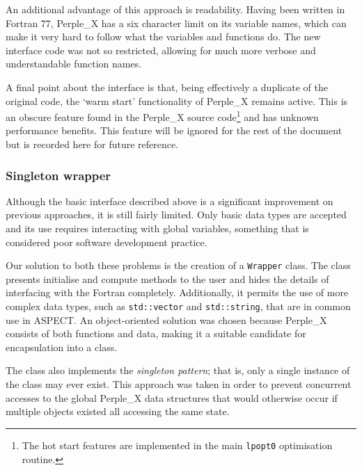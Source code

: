 An additional advantage of this approach is readability.
Having been written in Fortran 77, Perple\_X has a six character limit on its variable names, which can make it very hard to follow what the variables and functions do.
The new interface code was not so restricted, allowing for much more verbose and understandable function names.

A final point about the interface is that, being effectively a duplicate of the original code, the `warm start' functionality of Perple\_X remains active.
This is an obscure feature found in the Perple\_X source code\footnote{The hot start features are implemented in the main \texttt{lpopt0} optimisation routine.} and has unknown performance benefits.
This feature will be ignored for the rest of the document but is recorded here for future reference.

\subsubsection{Singleton wrapper}

Although the basic interface described above is a significant improvement on previous approaches, it is still fairly limited.
Only basic data types are accepted and its use requires interacting with global variables, something that is considered poor software development practice.

Our solution to both these problems is the creation of a \texttt{Wrapper} class.
The class presents \mbox{initialise} and compute methods to the user and hides the details of interfacing with the Fortran \mbox{completely}.
\mbox{Additionally}, it permits the use of more complex data types, such as \texttt{std::vector} and \texttt{std::string}, that are in common use in ASPECT.
An object-oriented solution was chosen because Perple\_X consists of both functions and data, making it a suitable candidate for encapsulation into a class.

The class also implements the \textit{singleton pattern}; that is, only a single instance of the class may ever exist.
This approach was taken in order to prevent concurrent accesses to the global Perple\_X data structures that would otherwise occur if multiple objects existed all accessing the same state.

